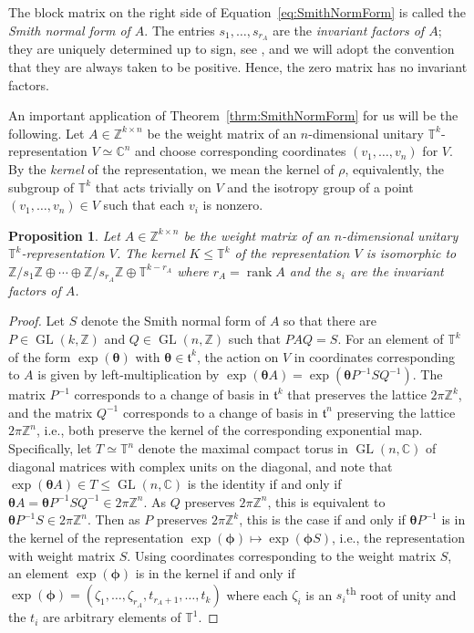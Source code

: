 \documentclass[twoside]{amsart}
\newtheorem{proposition}[theorem]{Proposition}
\theoremstyle{definition}
\theoremstyle{remark}
\numberwithin{equation}{section}
\newcommand{\C}{\mathbb{C}}
\newcommand{\T}{\mathbb{T}}
\newcommand{\Z}{\mathbb{Z}}
\newcommand{\Rank}{\operatorname{rank}}
\newcommand{\bs}{\boldsymbol}
\newcommand{\GL}{\operatorname{GL}}
\begin{document}
The block matrix on the right side of Equation~\eqref{eq:SmithNormForm} is called the \emph{Smith normal form of $A$}.
The entries $s_1,\ldots,s_{r_A}$ are the \emph{invariant factors of $A$}; they are uniquely determined up to sign, see
\cite[Ch.~5, Rem.~3.2(2)]{AdkinsWeintraub}, and we will adopt the convention that they are always taken to be positive.
Hence, the zero matrix has no invariant factors.

An important application of Theorem~\ref{thrm:SmithNormForm} for us will be the following.
Let $A\in\Z^{k\times n}$ be the weight matrix of an $n$-dimensional unitary $\T^k$-representation $V\simeq\C^n$ and choose corresponding
coordinates $(v_1,\ldots,v_n)$ for $V$. By the \emph{kernel} of the representation, we mean the kernel of $\rho$, equivalently,
the subgroup of $\T^k$ that acts trivially on $V$ and the isotropy group of a point $(v_1,\ldots,v_n)\in V$ such that each $v_i$ is nonzero.

\begin{proposition}
\label{prop:SmithIsotropy}
Let $A\in\Z^{k\times n}$ be the weight matrix of an $n$-dimensional unitary $\T^k$-representation $V$. The kernel $K\leq\T^k$ of the representation $V$
is isomorphic to $\Z/s_1\Z \oplus\cdots\oplus \Z/s_{r_A}\Z\oplus\T^{k-r_A}$ where $r_A = \Rank A$ and the $s_i$ are the invariant factors of $A$.
\end{proposition}
\begin{proof}
Let $S$ denote the Smith normal form of $A$ so that there are $P\in\GL(k,\Z)$ and $Q\in\GL(n,\Z)$ such that $PAQ = S$.
For an element of $\T^k$ of the form $\exp(\bs{\theta})$ with $\bs{\theta}\in\mathfrak{t}^k$,
the action on $V$ in coordinates corresponding to $A$ is given by left-multiplication by $\exp(\bs{\theta}A) = \exp(\bs{\theta}P^{-1}SQ^{-1})$.
The matrix $P^{-1}$ corresponds to a change of basis in $\mathfrak{t}^k$ that preserves the lattice $2\pi\Z^k$,
and the matrix $Q^{-1}$ corresponds to a change of basis in $\mathfrak{t}^n$ preserving the lattice $2\pi\Z^n$, i.e., both preserve the kernel of the
corresponding exponential map. Specifically, let $T\simeq\T^n$ denote the maximal compact torus in $\GL(n,\C)$ of diagonal matrices with complex units on the diagonal,
and note that $\exp(\bs{\theta}A)\in T\leq\GL(n,\C)$ is the identity if and only if
$\bs{\theta}A = \bs{\theta}P^{-1}SQ^{-1}\in 2\pi\Z^n$.
As $Q$ preserves $2\pi\Z^n$, this is equivalent to $\bs{\theta}P^{-1}S\in 2\pi\Z^n$. Then as $P$ preserves $2\pi\Z^k$, this is the case if and only if
$\bs{\theta}P^{-1}$ is in the kernel of the representation $\exp(\bs{\phi})\mapsto\exp(\bs{\phi}S)$, i.e., the representation with weight matrix $S$.
Using coordinates corresponding to the weight matrix $S$, an element $\exp(\bs{\phi})$ is in the kernel if and only if
$\exp(\bs{\phi}) = (\zeta_1,\ldots,\zeta_{r_A}, t_{r_A+1},\ldots, t_k)$ where each $\zeta_i$ is an $s_i$\textsuperscript{th} root of unity and the $t_i$
are arbitrary elements of $\T^1$.
\end{proof}
\end{document}
